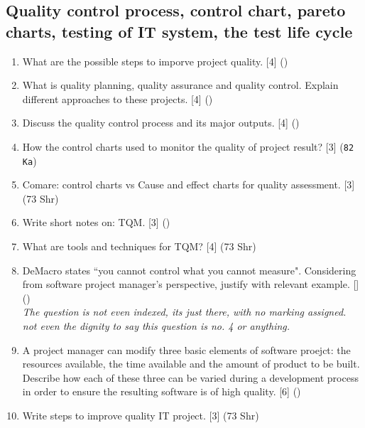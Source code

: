 \documentclass[12pt]{article}
\begin{document}
  \subsection{Quality control process, control chart, pareto charts, testing of IT system, the test life cycle}
    \begin{enumerate}
      \item What are the possible steps to imporve project quality. \hfill [4] ()

      \item What is quality planning, quality assurance and quality control. Explain different approaches to these projects. \hfill [4] ()

      \item Discuss the quality control process and its major outputs. \hfill [4] ()

      \item How the control charts used to monitor the quality of project result? \hfill [3] (\texttt{82 Ka})

      \item Comare: control charts vs Cause and effect charts for quality assessment. \hfill [3] (73 Shr)

      \item Write short notes on: TQM. \hfill [3] ()

      \item What are tools and techniques for TQM? \hfill [4] (73 Shr)

      \item DeMacro states ``you cannot control what you cannot measure". Considering from software project manager's perspective, justify with relevant example. \hfill [] ()\\
        \textit{The question is not even indexed, its just there, with no marking assigned. not even the dignity to say this question is no. 4 or anything.}

      \item A project manager can modify three basic elements of software proejct: the resources available, the time available and the amount of product to be built. Describe how each of these three can be varied during a development process in order to ensure the resulting software is of high quality. \hfill [6] ()

      \item Write steps to improve quality IT project. \hfill [3] (73 Shr)


\end{enumerate}
\end{document}
